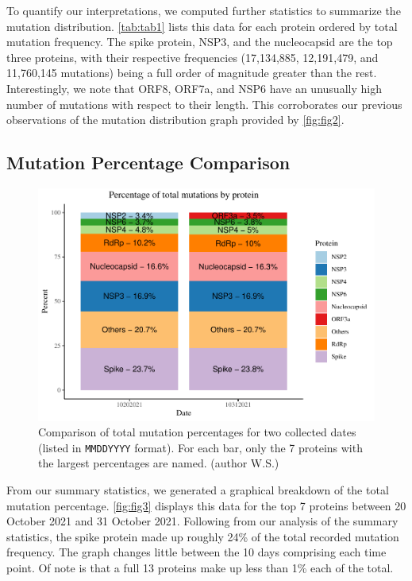 \documentclass{article}
\begin{document}
To quantify our interpretations, we computed further statistics to
summarize the mutation distribution. \autoref{tab:tab1} lists this data
for each protein ordered by total mutation frequency. The spike protein,
NSP3, and the nucleocapsid are the top three proteins, with their
respective frequencies (17,134,885, 12,191,479, and 11,760,145
mutations) being a full order of magnitude greater than the rest.
Interestingly, we note that ORF8, ORF7a, and NSP6 have an unusually high
number of mutations with respect to their length. This corroborates our
previous observations of the mutation distribution graph provided by
\autoref{fig:fig2}.

\hypertarget{mutation-percentage-comparison}{%
\subsection{Mutation Percentage
Comparison}\label{mutation-percentage-comparison}}

\begin{figure}

{\centering \includegraphics[width=\textwidth]{./figures/stacked_bar} 

}

\caption{Comparison of total mutation percentages for two collected dates (listed in \texttt{MMDDYYYY} format). For each bar, only the 7 proteins with the largest percentages are named. (author W.S.)}\label{fig:fig3}
\end{figure}

From our summary statistics, we generated a graphical breakdown of the
total mutation percentage. \autoref{fig:fig3} displays this data for the
top 7 proteins between 20 October 2021 and 31 October 2021. Following
from our analysis of the summary statistics, the spike protein made up
roughly 24\% of the total recorded mutation frequency. The graph changes
little between the 10 days comprising each time point. Of note is that a
full 13 proteins make up less than 1\% each of the total.
\end{document}
